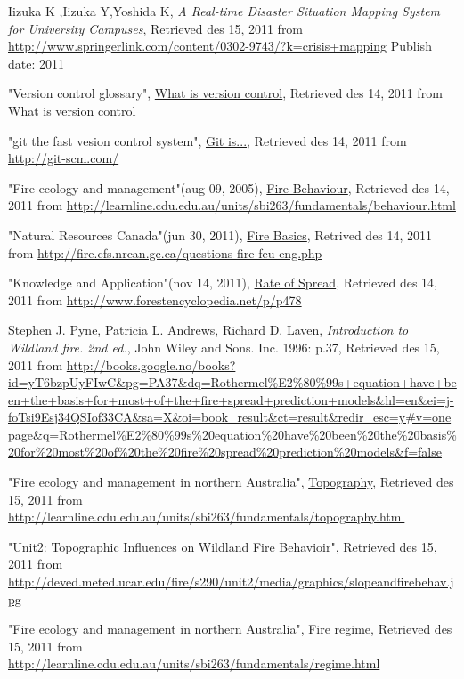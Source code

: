 \begin{thebibliography}{4}
 Iizuka K ,Iizuka Y,Yoshida K, \emph{A Real-time Disaster Situation Mapping System for University Campuses}, Retrieved des 15, 2011 from \url{http://www.springerlink.com/content/0302-9743/?k=crisis+mapping} Publish date: 2011 

 "Version control glossary", \underline{What is version control}, Retrieved des 14, 2011 from \url{What is version control}

 "git the fast vesion control system", \underline{Git is...}, Retrieved des 14, 2011 from \url{http://git-scm.com/}

 "Fire ecology and management"(aug 09, 2005), \underline{Fire Behaviour}, Retrieved des 14, 2011 from \url{http://learnline.cdu.edu.au/units/sbi263/fundamentals/behaviour.html}

 "Natural Resources Canada"(jun 30, 2011), \underline{Fire Basics}, Retrived des 14, 2011 from \url{http://fire.cfs.nrcan.gc.ca/questions-fire-feu-eng.php}

 "Knowledge and Application"(nov 14, 2011), \underline{Rate of Spread}, Retrieved des 14, 2011 from \url{http://www.forestencyclopedia.net/p/p478}

 Stephen J. Pyne, Patricia L. Andrews, Richard D. Laven, \emph{Introduction to Wildland fire. 2nd ed.}, John Wiley and Sons. Inc. 1996: p.37, Retrieved des 15, 2011 from
\url{http://books.google.no/books?id=yT6bzpUyFIwC&pg=PA37&dq=Rothermel%E2%80%99s+equation+have+been+the+basis+for+most+of+the+fire+spread+prediction+models&hl=en&ei=j-foTsi9Esj34QSIof33CA&sa=X&oi=book_result&ct=result&redir_esc=y#v=onepage&q=Rothermel%E2%80%99s%20equation%20have%20been%20the%20basis%20for%20most%20of%20the%20fire%20spread%20prediction%20models&f=false}

 "Fire ecology and management in northern Australia", \underline{Topography}, Retrieved des 15, 2011 from \url{http://learnline.cdu.edu.au/units/sbi263/fundamentals/topography.html}

 "Unit2: Topographic Influences on Wildland Fire Behavioir", Retrieved des 15, 2011 from \url{http://deved.meted.ucar.edu/fire/s290/unit2/media/graphics/slopeandfirebehav.jpg}

 "Fire ecology and management in northern Australia", \underline{Fire regime}, Retrieved des 15, 2011 from \url{http://learnline.cdu.edu.au/units/sbi263/fundamentals/regime.html}


\end{thebibliography}
